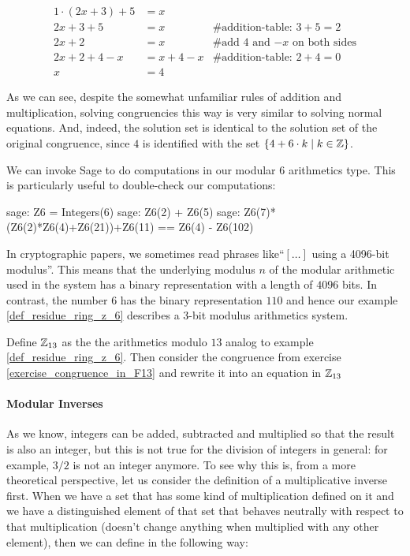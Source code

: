 \begin{example} 
\begin{align*}
1\cdot (2x+3) + 5 &= x & \text{ }\\
2x+3 + 5 &= x & \text{\# addition-table: } 3+5 = 2 \\
2x+2 &= x & \text{\# add 4 and $-x$ on both sides} \\
2x+2 +4 -x &= x + 4 -x & \text{\# addition-table: } 2+4 = 0 \\
x &= 4 &
\end{align*}

As we can see, despite the somewhat unfamiliar rules of addition and multiplication, solving congruencies this way is very similar to solving normal equations. And, indeed, the solution set is identical to the solution set of the original congruence, since $4$ is identified with the set $\{4+6\cdot k\;|\; k\in\mathbb{Z}\}$.

We can invoke Sage to do computations in our modular $6$ arithmetics type. This is particularly useful to double-check our computations:
\begin{sagecommandline}
sage: Z6 = Integers(6)
sage: Z6(2) + Z6(5)
sage: Z6(7)*(Z6(2)*Z6(4)+Z6(21))+Z6(11) == Z6(4) - Z6(102)
\end{sagecommandline}
\end{example}

\begin{jargon} In cryptographic papers, we sometimes read phrases like``$[\ldots]$ using a 4096-bit modulus''. This means that the underlying modulus $n$ of the modular arithmetic used in the system has a binary representation with a length of $4096$ bits. In contrast, the number $6$ has the binary representation $110$ and hence our example \ref{def_residue_ring_z_6}
 describes a $3$-bit modulus arithmetics system.   
\end{jargon}
\begin{exercise}
Define $\mathbb{Z}_{13}$ as the the arithmetics modulo $13$ analog to example \ref{def_residue_ring_z_6}. Then consider the congruence from exercise \ref{exercise_congruence_in_F13} and rewrite it into an equation in $\mathbb{Z}_{13}$
\end{exercise}

\paragraph{Modular Inverses} 
As we know, integers can be added, subtracted and multiplied so that the result is also an integer, but this is not true for the division of integers in general: for example, $3/2$ is not an integer anymore. To see why this is, from a more theoretical perspective, let us consider the definition of a multiplicative inverse first. When we have a set that has some kind of multiplication defined on it and we have a distinguished element of that set that behaves neutrally with respect to that multiplication (doesn't change anything when multiplied with any other element), then we can define  in the following way:

